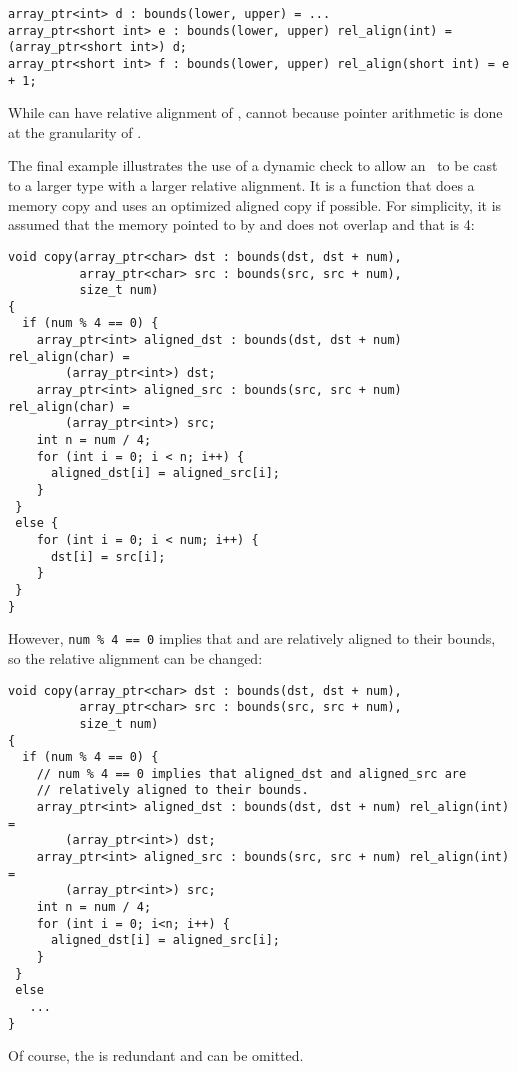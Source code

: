 \begin{verbatim}
array_ptr<int> d : bounds(lower, upper) = ...
array_ptr<short int> e : bounds(lower, upper) rel_align(int) = (array_ptr<short int>) d;
array_ptr<short int> f : bounds(lower, upper) rel_align(short int) = e + 1;
\end{verbatim}

While  can have relative alignment of , 
cannot because pointer arithmetic is done at the granularity of
.

The final example illustrates the use of a dynamic check to allow an
\arrayptrchar\ to be cast to a larger type with a larger relative alignment.
It is a function that does a memory copy and uses an optimized aligned copy if
possible.  For simplicity, it is assumed that the memory pointed to by
 and  does not overlap and that  is 4:
\begin{lstlisting}
void copy(array_ptr<char> dst : bounds(dst, dst + num),
          array_ptr<char> src : bounds(src, src + num),
          size_t num)
{
  if (num % 4 == 0) {
    array_ptr<int> aligned_dst : bounds(dst, dst + num) rel_align(char) =
        (array_ptr<int>) dst;
    array_ptr<int> aligned_src : bounds(src, src + num) rel_align(char) =
        (array_ptr<int>) src;
    int n = num / 4;
    for (int i = 0; i < n; i++) {
      aligned_dst[i] = aligned_src[i];
    }
 }
 else {
    for (int i = 0; i < num; i++) {
      dst[i] = src[i];
    }
 }
}
\end{lstlisting}

However, \lstinline|num % 4 == 0| implies that  and
 are relatively aligned to their bounds, so the
relative alignment can be changed:

\begin{lstlisting}
void copy(array_ptr<char> dst : bounds(dst, dst + num),
          array_ptr<char> src : bounds(src, src + num),
          size_t num)
{
  if (num % 4 == 0) {
    // num % 4 == 0 implies that aligned_dst and aligned_src are
    // relatively aligned to their bounds.
    array_ptr<int> aligned_dst : bounds(dst, dst + num) rel_align(int) =
        (array_ptr<int>) dst;
    array_ptr<int> aligned_src : bounds(src, src + num) rel_align(int) =
        (array_ptr<int>) src;
    int n = num / 4;
    for (int i = 0; i<n; i++) {
      aligned_dst[i] = aligned_src[i];
    }
 }
 else
   ...
}
\end{lstlisting}

Of course, the  is redundant and can be omitted.

